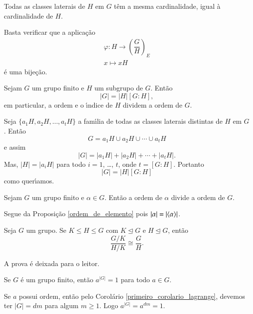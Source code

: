 \begin{proposicao}
	Todas as classes laterais de $H$ em $G$ t\^em a mesma cardinalidade, igual \`a cardinalidade de $H$.
\end{proposicao}
\begin{prova}
	Basta verificar que a aplica\c{c}\~ao
	\begin{align*}
		\varphi : H \to \left(\dfrac{G}{H}\right)_E\\
		x \mapsto xH
	\end{align*}
	\'e uma bije\c{c}\~ao.
\end{prova}

\begin{teorema}\label{teorema_de_lagrange}
	Sejam $G$ um grupo finito e $H$ um subgrupo de $G$. Ent\~ao
	\[
		|G| = |H|[G:H],
	\]
	em particular, a ordem e o {\'\i}ndice de $H$ dividem a ordem de $G$.
\end{teorema}
\begin{prova}
	Seja $\{a_1H, a_2H, \dots, a_tH\}$ a fam{\'\i}lia de todas as classes laterais distintas de $H$ em $G$. Ent\~ao
	\[
		G = a_1H \cup a_2H \cup \cdots \cup a_tH
	\]
	e assim
	\[
		|G| = |a_1H| + |a_2H| + \cdots + |a_tH|.
	\]
	Mas, $|H| = |a_iH|$ para todo $i = 1$, \dots, $t$, onde $t = [G:H]$. Portanto
	\[
		|G| = |H|[G:H]
	\]
	como quer{\'\i}amos.
\end{prova}

\begin{corolario}\label{primeiro_corolario_lagrange}
	Sejam $G$ um grupo finito e $\alpha \in G$. Ent\~ao a ordem de $\alpha$ divide a ordem de $G$.
\end{corolario}
\begin{prova}
	Segue da Proposi\c{c}\~ao \ref{ordem_de_elemento} pois $|\alpha| = |\langle{\alpha}\rangle|$.
\end{prova}

\begin{corolario}\label{segundo_corolario_lagrange}
	Seja $G$ um grupo. Se $K \le H \le G$ com $K \unlhd G$ e $H \unlhd G$, ent\~ao
\[
  \dfrac{G/K}{H/K} \cong \dfrac{G}{H}.
\]
\end{corolario}
\begin{prova}
	A prova \'e deixada para o leitor.
\end{prova}

\begin{corolario}
	Se $G$ \'e um grupo finito, ent\~ao $a^{|G|} = 1$ para todo $a \in G$.
\end{corolario}
\begin{prova}
	Se $a$ possui ordem, ent\~ao pelo Corol\'ario \ref{primeiro_corolario_lagrange}, devemos ter $|G| = dm$ para algum $m \ge 1$. Logo $a^{|G|} = a^{dm} = 1$.
\end{prova}

